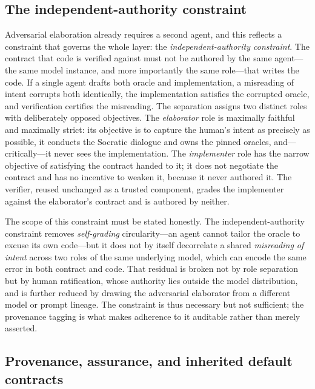 \subsection{The independent-authority constraint}\label{subsec:a5-independent}

Adversarial elaboration already requires a second agent, and this reflects a constraint that governs the whole layer: the \emph{independent-authority constraint}. The contract that code is verified against must not be authored by the same agent---the same model instance, and more importantly the same role---that writes the code. If a single agent drafts both oracle and implementation, a misreading of intent corrupts both identically, the implementation satisfies the corrupted oracle, and verification certifies the misreading. The separation assigns two distinct roles with deliberately opposed objectives. The \emph{elaborator} role is maximally faithful and maximally strict: its objective is to capture the human's intent as precisely as possible, it conducts the Socratic dialogue and owns the pinned oracles, and---critically---it never sees the implementation. The \emph{implementer} role has the narrow objective of satisfying the contract handed to it; it does not negotiate the contract and has no incentive to weaken it, because it never authored it. The verifier, reused unchanged as a trusted component, grades the implementer against the elaborator's contract and is authored by neither.

The scope of this constraint must be stated honestly. The independent-authority constraint removes \emph{self-grading} circularity---an agent cannot tailor the oracle to excuse its own code---but it does not by itself decorrelate a shared \emph{misreading of intent} across two roles of the same underlying model, which can encode the same error in both contract and code. That residual is broken not by role separation but by human ratification, whose authority lies outside the model distribution, and is further reduced by drawing the adversarial elaborator from a different model or prompt lineage. The constraint is thus necessary but not sufficient; the provenance tagging is what makes adherence to it auditable rather than merely asserted.

\subsection{Provenance, assurance, and inherited default contracts}\label{subsec:a5-defaults}

